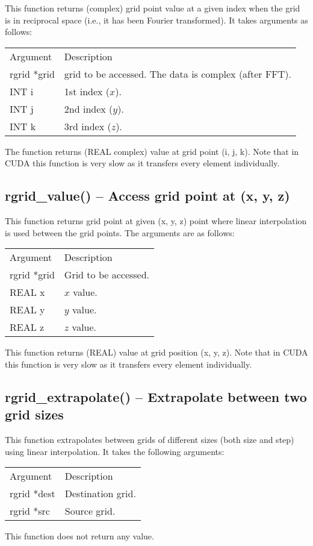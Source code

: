 \documentclass[12pt,letterpaper]{report}
\begin{document}
This function returns (complex) grid point value at a given index when the grid is in reciprocal space (i.e., it has been Fourier transformed). It takes arguments as follows:
\begin{longtable}{p{} p{}}
Argument & Description\\
\cline{1-2}
rgrid *grid & grid to be accessed. The data is complex (after FFT).\\
INT i & 1st index ($x$).\\
INT j & 2nd index ($y$).\\
INT k & 3rd index ($z$).\\
\end{longtable}
\noindent
The function returns (REAL complex) value at grid point (i, j, k). Note that in CUDA this function is very slow as it transfers every element individually.

\subsection{rgrid\_value() -- Access grid point at (x, y, z)}

This function returns grid point at given (x, y, z) point where linear interpolation is used between the grid points. The arguments are as follows:
\begin{longtable}{p{} p{}}
Argument & Description\\
\cline{1-2}
rgrid *grid & Grid to be accessed.\\
REAL x & $x$ value.\\
REAL y & $y$ value.\\
REAL z & $z$ value.\\
\end{longtable}
\noindent
This function returns (REAL) value at grid position (x, y, z). Note that in CUDA this function is very slow as it transfers every element individually.

\subsection{rgrid\_extrapolate() -- Extrapolate between two grid sizes}

This function extrapolates between grids of different sizes (both size and step) using linear interpolation. It takes the following arguments:
\begin{longtable}{p{} p{}}
Argument & Description\\
\cline{1-2}
rgrid *dest & Destination grid.\\
rgrid *src  & Source grid.\\
\end{longtable}
\noindent
This function does not return any value. 
\end{document}
